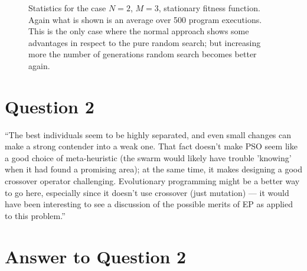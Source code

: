 \documentclass{report}
\begin{document}
\begin{figure}[h]
\centering
{}
\caption[]{Statistics for the case $N=2$, $M=3$, stationary fitness function. Again what is shown is an average over 500 program executions. This is the only case where the normal approach shows some advantages in respect to the pure random search; but increasing more the number of generations random search becomes better again.}
\label{plot23stationary}
\end{figure}

\section*{Question 2}
``The best individuals seem to be highly separated, and even small
    changes can make a strong contender into a weak one. That fact
    doesn't make PSO seem like a good choice of meta-heuristic (the
    swarm would likely have trouble 'knowing' when it had found a
    promising area); at the same time, it makes designing a good
    crossover operator challenging. Evolutionary programming might be a
    better way to go here, especially since it doesn't use crossover
    (just mutation) --- it would have been interesting to see a
    discussion of the possible merits of EP as applied to this problem.''

\section*{Answer to Question 2}
\end{document}
